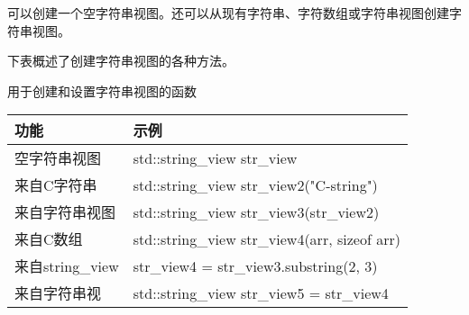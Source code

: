 可以创建一个空字符串视图。还可以从现有字符串、字符数组或字符串视图创建字符串视图。

下表概述了创建字符串视图的各种方法。

\begin{center}
用于创建和设置字符串视图的函数
\end{center}

\begin{longtable}[c]{|l|l|}
\hline
\textbf{功能} & \textbf{示例}                              \\ \hline
\endfirsthead
%
\endhead
%
空字符串视图        & std::string\_view str\_view                   \\ \hline
来自C字符串           & std::string\_view str\_view2("C-string")      \\ \hline
来自字符串视图        & std::string\_view str\_view3(str\_view2)      \\ \hline
来自C数组            & std::string\_view str\_view4(arr, sizeof arr) \\ \hline
来自string\_view       & str\_view4 = str\_view3.substring(2, 3)       \\ \hline
来自字符串视        & std::string\_view str\_view5 = str\_view4     \\ \hline
\end{longtable}























